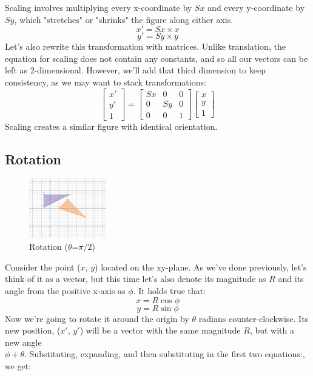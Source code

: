 \documentclass{article}
\begin{document}
Scaling involves multiplying every x-coordinate by $Sx$ and every y-coordinate by $Sy$, which "stretches" or "shrinks" the figure along either axis.
\[x' = Sx\times x\]
\[y' = Sy\times y\]
\noident
Let's also rewrite this transformation with matrices. Unlike translation, the equation for scaling does not contain any constants, and so all our vectors can be left as 2-dimensional. However, we'll add that third dimension to keep consistency, as we may want to stack transformations:
\[
\begin{bmatrix}
x' \\
y' \\
1
\end{bmatrix}
=
\begin{bmatrix}
Sx & 0 & 0 \\
0 & Sy & 0 \\
0 & 0 & 1
\end{bmatrix}
\begin{bmatrix}
x \\
y \\
1
\end{bmatrix}
\]
\noindent
Scaling creates a similar figure with identical orientation.

\subsection{Rotation}
\begin{figure}
  \begin{center}
    \vspace{-70pt}
    \includegraphics[width=0.30\textwidth]{2d_rotation.png}
    \vspace{-12.5pt}
  \end{center}
  \caption{Rotation ($\theta$=$\pi/2$)}
\end{figure}

Consider the point ($x$, $y$) located on the xy-plane. As we've done previously, let's think of it as a vector, but this time let's also denote its magnitude as $R$ and its angle from the positive x-axis as $\phi$. It holds true that:
\[x = R \cos \phi\]
\[y = R \sin \phi\]
\noindent
Now we're going to rotate it around the origin by $\theta$ radians counter-clockwise. Its new position, ($x'$, $y'$) will be a vector with the same magnitude $R$, but with a new angle \\
$\phi + \theta$. Substituting, expanding, and then substituting in the first two equations:, we get:
\end{document}
